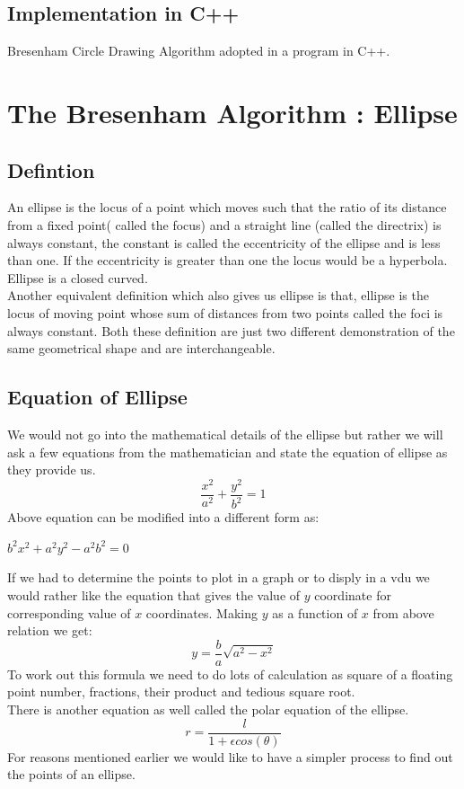 \documentclass[a4paper,12pt,oneside]{book}
\begin{document}
\section{Implementation in C++}
Bresenham Circle Drawing Algorithm adopted in a program  in C++.

\chapter{The Bresenham Algorithm : Ellipse}
\section{Defintion}
An ellipse is the locus of a point which moves such that the ratio of its distance from a fixed point( called the focus) and a straight line (called the directrix) is always constant, the constant is called the eccentricity of the ellipse and is less than one. If the eccentricity is greater than one the locus would be a hyperbola. Ellipse is a closed curved.\\
Another equivalent definition which also gives us ellipse is that, ellipse is the locus of moving point whose sum of distances from two points called the foci is always constant. Both these definition are just two different demonstration of the same geometrical shape and are interchangeable. 
\section{Equation of Ellipse}
We would not go into the mathematical details of the ellipse but rather we will ask a few equations from the mathematician and state the equation of ellipse as they provide us.
\begin{equation} \label{eq:generalellipse}
	\frac{x^2}{a^2}+\frac{y^2}{b^2}=1
\end{equation}
Above equation can be modified into a different form as:
\begin{center}
	$b^2x^2+a^2y^2-a^2b^2=0$
\end{center}

If we had to determine the points to plot in a graph or to disply in a vdu we would rather like the equation that gives the value of $y$ coordinate for corresponding value of $x$ coordinates. Making $y$ as a function of $x$ from above relation we get:
\begin{equation}
	y=\frac{b}{a}\sqrt{a^2-x^2}
\end{equation}
To work out this formula we need to do lots of calculation as square of a floating point number, fractions, their product and tedious square root.\\
There is another equation as well called the polar equation of the ellipse.
\begin{equation}
	r=\frac{l}{1+\epsilon cos(\theta)}
\end{equation}
 For reasons mentioned earlier we would like to have a simpler process to find out the points of an ellipse.
\end{document}
